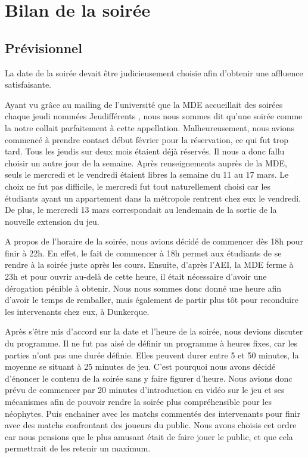 \section{Bilan de la soirée}%
\label{sec:Bilan_de_la_soiree}

\subsection{Prévisionnel}%
\label{sub:previsionnel}

La date de la soirée devait être judicieusement choisie afin d'obtenir une affluence satisfaisante.

Ayant vu grâce au mailing de l’université que la MDE accueillait des soirées chaque jeudi
nommées \og Jeudifférents \fg{}, nous nous sommes dit qu’une soirée comme la notre collait
parfaitement à cette appellation. Malheureusement, nous avions commencé à prendre contact
début février pour la réservation, ce qui fut trop tard. Tous les jeudis sur deux mois étaient
déjà réservés.
Il nous a donc fallu choisir un autre jour de la semaine. Après renseignements auprès de la
MDE, seuls le mercredi et le vendredi étaient libres la semaine du 11 au 17 mars. Le choix ne
fut pas difficile, le mercredi fut tout naturellement choisi car les étudiants ayant un appartement
dans la métropole rentrent chez eux le vendredi. De plus, le mercredi 13 mars correspondait
au lendemain de la sortie de la nouvelle extension du jeu.

A propos de l’horaire de la soirée, nous avions décidé de commencer dès 18h pour finir à
22h. En effet, le fait de commencer à 18h permet aux étudiants de se rendre à la soirée juste
après les cours. Ensuite, d’après l’AEI, la MDE ferme à 23h et pour ouvrir au-delà de cette
heure, il était nécessaire d’avoir une dérogation pénible à obtenir. Nous nous sommes donc
donné une heure afin d’avoir le temps de remballer, mais également de partir plus tôt pour
reconduire les intervenants chez eux, à Dunkerque.

Après s’être mis d’accord sur la date et l’heure de la soirée, nous devions discuter du
programme.
Il ne fut pas aisé de définir un programme à heures fixes, car les parties n’ont pas une durée
définie. Elles peuvent durer entre 5 et 50 minutes, la moyenne se situant à 25 minutes de jeu.
C’est pourquoi nous avons décidé d’énoncer le contenu de la soirée sans y faire figurer
d’heure.
Nous avions donc prévu de commencer par 20 minutes d’introduction en vidéo sur le jeu et
ses mécanismes afin de pouvoir rendre la soirée plus compréhensible pour les néophytes.
Puis enchainer avec les matchs commentés des intervenants pour finir avec des matchs
confrontant des joueurs du public. Nous avons choisis cet ordre car nous pensions que le plus
amusant était de faire jouer le public, et que cela permettrait de les retenir un maximum.

